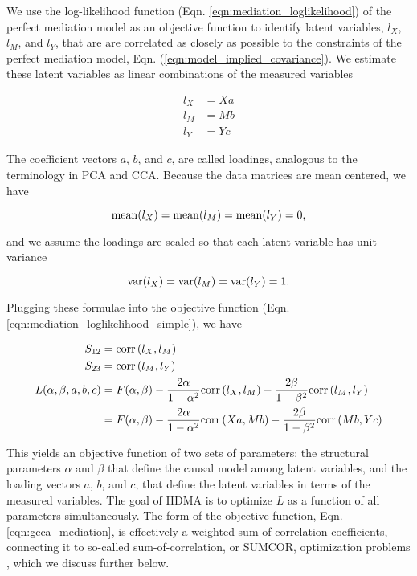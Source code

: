 \documentclass[
]{article}
\begin{document}
We use the log-likelihood function (Eqn.
\ref{eqn:mediation_loglikelihood}) of the perfect mediation model as an
objective function to identify latent variables, \(l_X\), \(l_M\), and
\(l_Y\), that are are correlated as closely as possible to the
constraints of the perfect mediation model, Eqn.
(\ref{eqn:model_implied_covariance}). We estimate these latent variables
as linear combinations of the measured variables

\begin{align}
l_X &= Xa \\
l_M &= Mb \\
l_Y &= Yc
\end{align}

The coefficient vectors \(a\), \(b\), and \(c\), are called loadings,
analogous to the terminology in PCA and CCA. Because the data matrices
are mean centered, we have

\begin{equation}
{\rm mean}(l_X) = {\rm mean}(l_M) = {\rm mean}(l_Y) = 0,
\end{equation}

and we assume the loadings are scaled so that each latent variable has
unit variance

\begin{equation}
{\rm var}(l_X) = {\rm var}(l_M) = {\rm var}(l_Y) = 1.
\end{equation}

Plugging these formulae into the objective function (Eqn.
\ref{eqn:mediation_loglikelihood_simple}), we have

\begin{align}
S_{12} &= {\rm corr}\left(l_X, l_M\right)\\
S_{23} &= {\rm corr}\left(l_M, l_Y\right)\\
\label{eqn:gcca_mediation}
L(\alpha, \beta, a,b,c) &= F(\alpha, \beta) - \frac{2\alpha}{1-\alpha^2} {\rm corr}\left(l_X, l_M\right) - \frac{2\beta}{1-\beta^2} {\rm corr}\left(l_M, l_Y\right) \\ 
&= F(\alpha, \beta) - \frac{2\alpha}{1-\alpha^2} {\rm corr}\left(Xa, Mb\right) - \frac{2\beta}{1-\beta^2} {\rm corr}\left(Mb, Yc\right)
\end{align}

This yields an objective function of two sets of parameters: the
structural parameters \(\alpha\) and \(\beta\) that define the causal
model among latent variables, and the loading vectors \(a\), \(b\), and
\(c\), that define the latent variables in terms of the measured
variables. The goal of HDMA is to optimize \(L\) as a function of all
parameters simultaneously. The form of the objective function, Eqn.
\ref{eqn:gcca_mediation}, is effectively a weighted sum of correlation
coefficients, connecting it to so-called sum-of-correlation, or SUMCOR,
optimization problems \cite{tenenhaus2011regularized}, which we discuss
further below.
\end{document}
